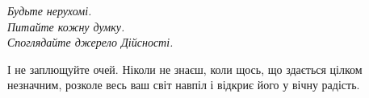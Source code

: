 \begin{center}
\itshape
Будьте нерухомі.\\
Питайте кожну думку.\\
Споглядайте джерело Дійсності.
\end{center}

І не заплющуйте очей. Ніколи не знаєш, коли щось, що здається цілком незначним, розколе весь ваш світ навпіл і відкриє його у вічну радість.
